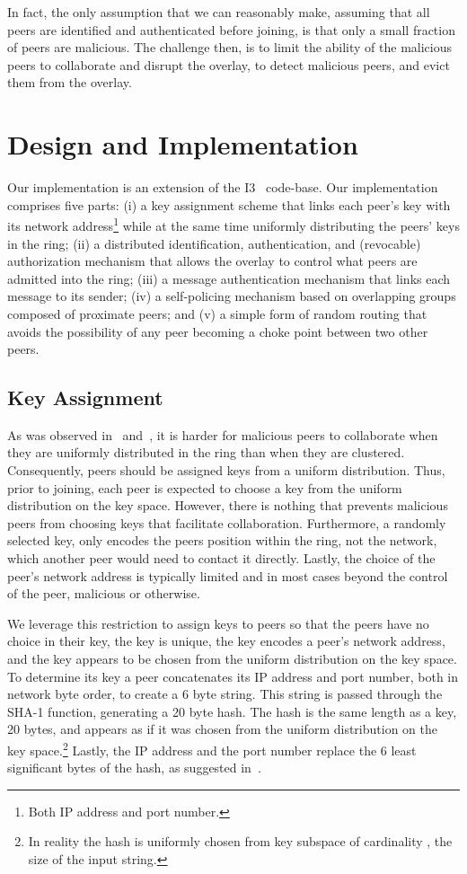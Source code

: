 \documentclass[11pt]{article}
\begin{document}
In fact, the only assumption that we can reasonably make, assuming
that all peers are identified and authenticated before joining, is
that only a small fraction of peers are malicious.  The challenge
then, is to limit the ability of the malicious peers to collaborate
and disrupt the overlay, to detect malicious peers, and evict them 
from the overlay.


\section{Design and Implementation}\label{sec:imp}
Our implementation is an extension of the I3~\cite{StAdZhShSu04}
code-base.  Our implementation comprises five parts: (i) a key
assignment scheme that links each peer's key with its network
address\footnote{Both IP address and port number.} while at the
same time uniformly distributing the peers' keys in the ring; (ii)
a distributed identification, authentication, and (revocable)
authorization mechanism that allows the overlay to control what
peers are admitted into the ring; (iii) a message authentication
mechanism that links each message to its sender; (iv) a self-policing
mechanism based on overlapping groups composed of proximate peers;
and (v) a simple form of random routing that avoids the possibility
of any peer becoming a choke point between two other peers.


\subsection{Key Assignment}
As was observed in~\cite{SiMo02} and~\cite{CaDrGaRoWa02}, it is
harder for malicious peers to collaborate when they are uniformly
distributed in the ring than when they are clustered.  Consequently,
peers should be assigned keys from a uniform distribution.  Thus,
prior to joining, each peer is expected to choose a key from the
uniform distribution on the key space.  However, there is nothing
that prevents malicious peers from choosing keys that facilitate
collaboration.  Furthermore, a randomly selected key, only encodes
the peers position within the ring, not the network, which another
peer would need to contact it directly.  Lastly, the choice of the
peer's network address is typically limited and in most cases beyond
the control of the peer, malicious or otherwise.

We leverage this restriction to assign keys to peers so that the
peers have no choice in their key, the key is unique, the key encodes
a peer's network address, and the key appears to be chosen from the
uniform distribution on the key space.  To determine its key a peer
concatenates its IP address and port number, both in network byte
order, to create a 6 byte string.  This string is passed through
the SHA-1 function, generating a 20 byte hash.  The hash is the
same length as a key, 20 bytes, and appears as if it was chosen
from the uniform distribution on the key space.\footnote{In reality
the hash is uniformly chosen from key subspace of cardinality
, the size of the input string.}  Lastly, the IP address
and the port number replace the 6 least significant bytes of the
hash, as suggested in~\cite{CaDrGaRoWa02}.
\end{document}
